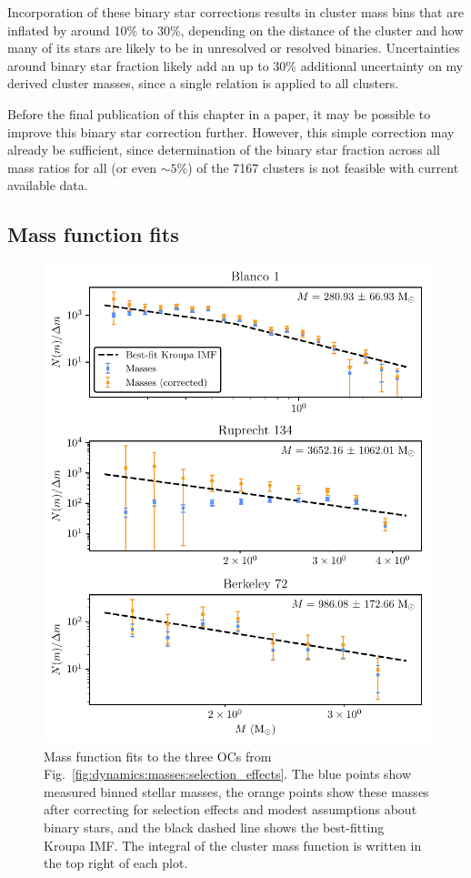 Incorporation of these binary star corrections results in cluster mass bins that are inflated by around 10\% to 30\%, depending on the distance of the cluster and how many of its stars are likely to be in unresolved or resolved binaries. Uncertainties around binary star fraction likely add an up to 30\% additional uncertainty on my derived cluster masses, since a single relation is applied to all clusters. 

Before the final publication of this chapter in a paper, it may be possible to improve this binary star correction further. However, this simple correction may already be sufficient, since determination of the binary star fraction across all mass ratios for all (or even $\sim5$\%) of the 7167 clusters is not feasible with current available data.


\subsection{Mass function fits}
\label{sec:dynamics:masses:imf_fits}

\begin{figure}[p]
    \centering
    \includegraphics[width=\textwidth]{fig/c4/mass_functions.pdf}
    \caption[Mass function fits to the three OCs from Fig.~\ref{fig:dynamics:masses:selection_effects}]{Mass function fits to the three OCs from Fig.~\ref{fig:dynamics:masses:selection_effects}. The blue points show measured binned stellar masses, the orange points show these masses after correcting for selection effects and modest assumptions about binary stars, and the black dashed line shows the best-fitting Kroupa IMF. The integral of the cluster mass function is written in the top right of each plot.}
    \label{fig:dynamics:masses:mass_functions}
\end{figure}

